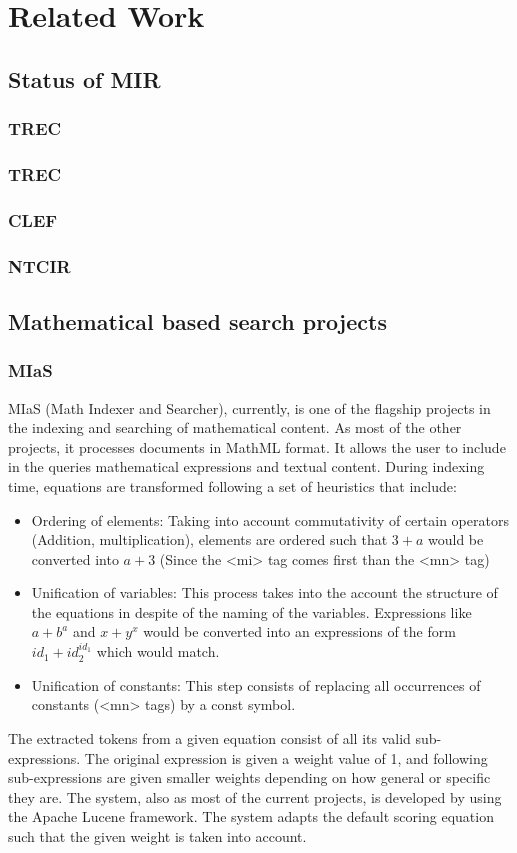 \chapter{Related Work}
\label{chap-related_work}
\section{Status of MIR}
\subsection{TREC}
\subsection{TREC}
\subsection{CLEF}
\subsection{NTCIR}
\section{Mathematical based search projects}
\subsection{MIaS}
MIaS\cite{mias_1} (Math Indexer and Searcher), currently, is one of the flagship projects in the indexing and searching of mathematical content. As most of the other projects, it processes documents in MathML format. It allows the user to include in the queries mathematical expressions and textual content. During indexing time, equations are transformed following a set of heuristics that include:
\begin{itemize}
  \item Ordering of elements: Taking into account commutativity of certain operators (Addition, multiplication), elements are ordered such that $3 + a$ would be converted into $a + 3$ (Since the <mi> tag comes first than the <mn> tag)
  \item Unification of variables: This process takes into the account the structure of the equations in despite of the naming of the variables. Expressions like $a+b^a$ and $x+y^x$ would be converted into an expressions of the form $id_1 + id_2^{id_1}$ which would match.
  \item Unification of constants: This step consists of replacing all occurrences of constants (<mn> tags) by a const symbol. 
\end{itemize}
The extracted tokens from a given equation consist of all its valid sub-expressions. The original expression is given a weight value of 1, and following sub-expressions are given smaller weights depending on how general or specific they are.  
The system, also as most of the current projects, is developed by using the Apache Lucene framework. The system adapts the default scoring equation such that the given weight is taken into account.  

